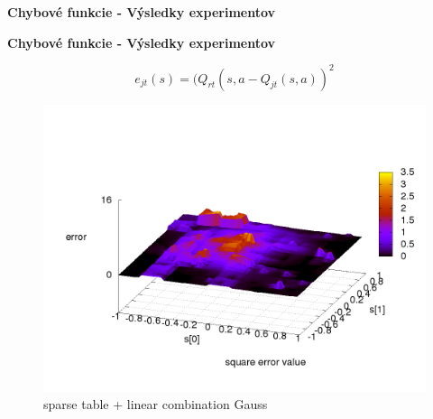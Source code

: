 \documentclass[xcolor=dvipsnames]{beamer}
\begin{document}
\begin{frame}{\bf Chybové funkcie - Výsledky experimentov}
\begin{minipage}{.5\textwidth}
\end{minipage}
\end{frame}


\begin{frame}{\bf Chybové funkcie - Výsledky experimentov}

\begin{equation}
e_{jt}(s) = (Q_{rt}(s,a - Q_{jt}(s,a))^2  \nonumber
\end{equation}

\begin{minipage}{.5\textwidth}

\begin{figure}[!htb]
\centering
\includegraphics[scale=.2]{../../results_q_learning/map_1/function_type_3/q_learning_error.png}
\caption{sparse table + linear combination Gauss}
\end{figure}


\end{minipage}%
\begin{minipage}{.5\textwidth}


\end{minipage}
\end{frame}
\end{document}
